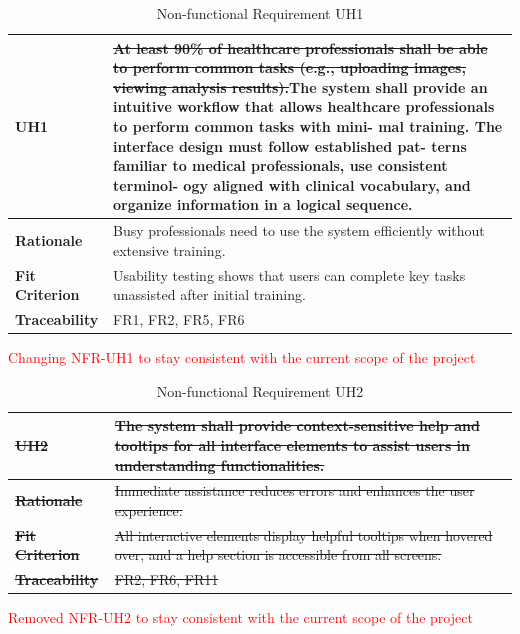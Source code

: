\documentclass[12pt]{article}
\begin{document}
\begin{table}[h!]
\centering
{}
\begin{tabular}{|p{3.5cm}|p{11.5cm}|}
\hline
\rowcolor{gray!30}
\textbf{UH1} & \sout{At least 90\% of healthcare professionals shall be able to perform common tasks (e.g., uploading images, viewing analysis results).}The system shall provide an intuitive workflow that allows healthcare professionals to perform common tasks with mini- mal training. The interface design must follow established pat- terns familiar to medical professionals, use consistent terminol- ogy aligned with clinical vocabulary, and organize information in a logical sequence. \\
\hline
\textbf{Rationale} & Busy professionals need to use the system efficiently without extensive training. \\
\hline
\textbf{Fit Criterion} & Usability testing shows that users can complete key tasks unassisted after initial training. \\
\hline
\textbf{Traceability} & FR1, FR2, FR5, FR6 \\
\hline
\end{tabular}
\caption{Non-functional Requirement UH1}
\textcolor{red}{Changing NFR-UH1 to stay consistent with the current scope of the project}
\end{table}

\begin{table}[h!]
\centering
{}
\begin{tabular}{|p{3.5cm}|p{11.5cm}|}
\hline
\rowcolor{gray!30}
\sout{\textbf{UH2}} & \sout{The system shall provide context-sensitive help and tooltips for all interface elements to assist users in understanding functionalities.} \\
\hline
\sout{\textbf{Rationale}} & \sout{Immediate assistance reduces errors and enhances the user experience.} \\
\hline
\sout{\textbf{Fit Criterion}} & \sout{All interactive elements display helpful tooltips when hovered over, and a help section is accessible from all screens.} \\
\hline
\sout{\textbf{Traceability}} &\sout{FR2, FR6, FR11} \\
\hline
\end{tabular}
\caption{Non-functional Requirement UH2}
\textcolor{red}{Removed NFR-UH2 to stay consistent with the current scope of the project}
\end{table}
\newpage
\end{document}
